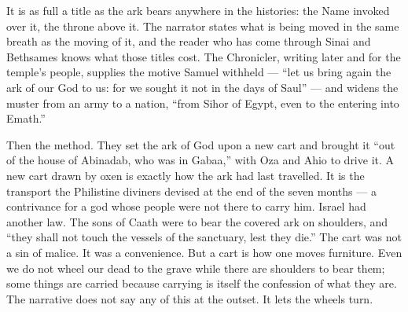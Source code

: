 It is as full a title as the ark bears anywhere in the histories: the Name
invoked over it, the throne above it. The narrator states what is being
moved in the same breath as the moving of it, and the reader who has come
through Sinai and Bethsames knows what those titles cost.
The Chronicler, writing later and for the temple's people, supplies
the motive Samuel withheld --- ``let us bring again the ark of our God to us:
for we sought it not in the days of Saul'' --- and widens the muster from an
army to a nation, ``from Sihor of Egypt, even to the entering into
Emath.''

Then the method. They set the ark of God upon a new cart and brought it
``out of the house of Abinadab, who was in Gabaa,'' with Oza and Ahio to
drive it. A new cart drawn by oxen is exactly how the ark had last
travelled. It is the transport the Philistine diviners devised at the end
of the seven months --- a contrivance for a god whose people were not there
to carry him. Israel had another law. The sons of Caath were to bear the
covered ark on shoulders, and ``they shall not touch the vessels of the
sanctuary, lest they die.'' The cart was not a sin of malice. It was
a convenience. But a cart is how one moves furniture. Even we do not wheel
our dead to the grave while there are shoulders to bear them; some things
are carried because carrying is itself the confession of what they are. The
narrative does not say any of this at the outset. It lets the wheels turn.

